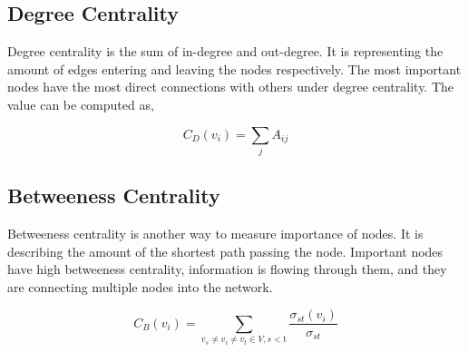\subsection{Degree Centrality}

Degree centrality is the sum of in-degree and out-degree.
It is representing the amount of edges entering and leaving the nodes respectively.
The most important nodes have the most direct connections with others under degree centrality.
The value can be computed as,

\begin{equation*}\label{eq:degree-centrality}
C_{D}(v_{i})={\sum}_{j}A_{ij} \tag{1}
\end{equation*}

\subsection{Betweeness Centrality}

Betweeness centrality is another way to measure importance of nodes.
It is describing the amount of the shortest path passing the node.
Important nodes have high betweeness centrality, information is flowing through them, and they are connecting multiple nodes into the network.

\begin{equation*}
    C_{B}(v_{i})={\sum}_{v_{s}\neq v_{i}\neq v_{t}\in V,s < \text{t}}\frac{\sigma_{st}(v_{i})}{\sigma_{st}} \tag{2}
\end{equation*}

